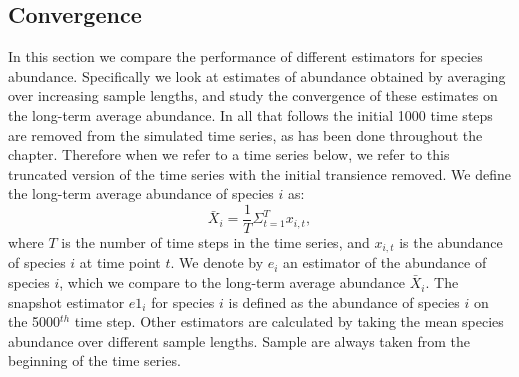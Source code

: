  
\subsection{Convergence}
\label{sec:convergence}
%
%

In this section we compare the performance of different estimators for species abundance. Specifically we look at estimates of abundance obtained by averaging over increasing sample lengths, and study the convergence of these estimates on the long-term average abundance. In all that follows the initial 1000 time steps are removed from the simulated time series, as has been done throughout the chapter. Therefore when we refer to a time series below, we refer to this truncated version of the time series with the initial transience removed. We define the long-term average abundance of species $i$ as:
\begin{equation}
\bar{X}_i = \frac{1}{T}\Sigma_{t=1}^T x_{i,t},
\label{eq:lta}
\end{equation}
%
where $T$ is the number of time steps in the time series, and $x_{i,t}$ is the abundance of species $i$ at time point $t$. We denote by $e_i$ an estimator of the abundance of species $i$, which we compare to the long-term average abundance $\bar{X}_i$. The snapshot estimator $e1_i$ for species $i$ is defined as the abundance of species $i$ on the 5000$^{th}$ time step. Other estimators are calculated by taking the mean species abundance over different sample lengths. Sample are always taken from the beginning of the time series.

